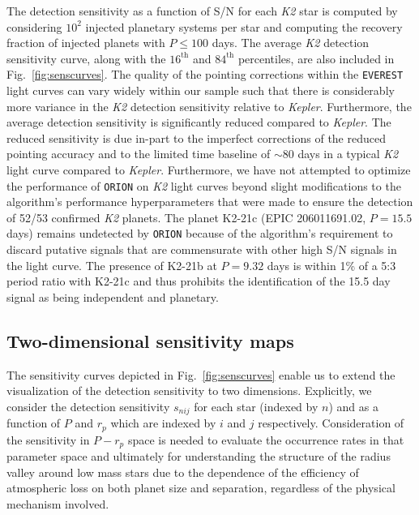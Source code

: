 \documentclass[twocolumn]{emulateapj}
\newcommand{\kepler}[1]{\emph{Kepler}#1}
\newcommand{\ktwo}[1]{\emph{K2}#1}
\begin{document}
The detection sensitivity as a function of S/N for each \ktwo{} star is computed by considering
$10^2$ injected planetary systems per star and computing the recovery fraction of injected planets with
$P \leq 100$ days. The average \ktwo{} detection sensitivity curve, along with the
$16^{\text{th}}$ and $84^{\text{th}}$ percentiles, are also included in Fig.~\ref{fig:senscurves}. The quality
of the pointing corrections within the \texttt{EVEREST} light curves can vary widely within our sample such
that there is considerably more variance in the \ktwo{} detection sensitivity relative to \kepler{.} Furthermore,
the average detection sensitivity is significantly reduced compared to \kepler{.} %
The reduced sensitivity is due in-part to the imperfect corrections of the reduced pointing accuracy and
to the limited time baseline of $\sim 80$ days in a typical \ktwo{} light curve compared to \kepler{.} 
Furthermore, we have not attempted to optimize the performance of \texttt{ORION} on \ktwo{} light curves 
beyond slight modifications to the algorithm's performance hyperparameters that were made to ensure the
detection of 52/53 confirmed \ktwo{} planets. The planet K2-21c (EPIC 206011691.02, $P=15.5$ days)
remains undetected by \texttt{ORION} because of the algorithm's requirement to discard putative signals
that are commensurate with other high S/N signals in the light curve. The presence of K2-21b at $P=9.32$ days
is within 1\% of a 5:3 period ratio with K2-21c and thus prohibits the identification of the 15.5 day signal
as being independent and planetary.


\subsection{Two-dimensional sensitivity maps}
The sensitivity curves depicted in Fig.~\ref{fig:senscurves} enable us to extend the visualization of the
detection sensitivity to two dimensions. Explicitly, we consider the detection sensitivity
$s_{nij}$ for each star (indexed by $n$) and as a function of $P$ and $r_p$ which are indexed by $i$ and
$j$ respectively. Consideration of the sensitivity in $P-r_p$ space is needed to evaluate the
occurrence rates in that parameter space and ultimately for understanding the structure of
the radius valley around low mass stars due to the dependence of the efficiency of atmospheric loss on
both planet size and separation, regardless of the physical mechanism involved. 
\end{document}
